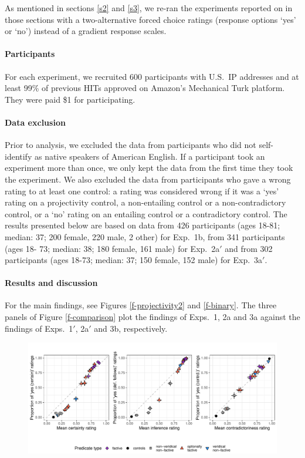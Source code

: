\documentclass[11pt,fleqn]{article}
\newcommand{\6}{\mbox{$[\hspace*{-.6mm}[$}}
\newcommand{\9}{\mbox{$]\hspace*{-.6mm}]$}}
\begin{document}
{As mentioned in sections \ref{s2} and \ref{s3}, we re-ran the experiments reported on in those sections with a two-alternative forced choice ratings (response options `yes' or `no') instead of a gradient response scales. 

\paragraph{Participants} For each experiment, we recruited 600 participants with U.S.\ IP addresses and at least 99\% of previous HITs approved on Amazon's Mechanical Turk platform. They were paid \$1 for participating. 

\paragraph{Data exclusion} Prior to analysis, we excluded the data from participants who did not self-identify as native speakers of American English. If a participant took an experiment more than once, we only kept the data from the first time they took the experiment. We also excluded the data from participants who gave a wrong rating to at least one control: a rating was considered wrong if it was a `yes' rating on a projectivity control, a non-entailing control or a non-contradictory control, or a `no' rating on an entailing control or a contradictory control. The results presented below are based on data from 426 participants (ages 18-81; median: 37; 200 female, 220 male, 2 other) for Exp.~1b, from 341 participants (ages 18- 73; median: 38; 180 female, 161 male) for Exp.~2a$'$ and from 302 participants (ages 18-73; median: 37; 150 female, 152 male) for Exp.~3a$'$.

\paragraph{Results and discussion} For the main findings, see Figures \ref{f-projectivity2} and \ref{f-binary}. The three panels of Figure \ref{f-comparison} plot the findings of Exps.~1, 2a and 3a against the findings of Exps.~1$'$, 2a$'$ and 3b, respectively.
    

    
\begin{figure}[h!]
\centering
\includegraphics[width=.75\paperwidth]{../../results/compare-diagnostics-and-response-tasks/graphs/joint-comparison-plot}
   

\end{figure}}
\end{document}
